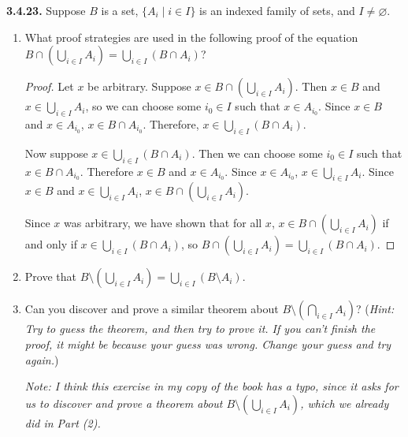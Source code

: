 \documentclass[12pt]{amsart}
\newenvironment{statement}[1]{\smallskip\noindent\color[rgb]{.6627, .3529, .6314} {\bf #1.}}{}
\theoremstyle{definition}
\theoremstyle{remark}
\begin{document}
\begin{statement}{3.4.23}
Suppose $B$ is a set, $\{ A_i \mid i \in I \}$ is an indexed family of sets, and $I \neq \varnothing$.
\begin{enumerate}
	\item What proof strategies are used in the following proof of the equation
	$B \cap \left( \bigcup_{i \in I} A_i \right) = \bigcup_{i \in I} (B \cap A_i)$?
	\begin{proof}
		Let $x$ be arbitrary.
		Suppose $x \in B \cap \left( \bigcup_{i \in I} A_i \right)$.
		Then $x \in B$ and $x \in \bigcup_{i \in I} A_i$,
		so we can choose some $i_0 \in I$ such that $x \in A_{i_0}$.
		Since $x \in B$ and $x \in A_{i_0}$, $x \in B \cap A_{i_0}$.
		Therefore, $x \in \bigcup_{i \in I} (B \cap A_i)$.
		
		Now suppose $x \in \bigcup_{i \in I} (B \cap A_i)$.
		Then we can choose some $i_0 \in I$ such that $x \in B \cap A_{i_0}$.
		Therefore $x \in B$ and $x \in A_{i_0}$.
		Since $x \in A_{i_0}$, $x \in \bigcup_{i \in I} A_i$.
		Since $x \in B$ and $x \in \bigcup_{i \in I} A_i$,
		$x \in B \cap \left( \bigcup_{i \in I} A_i \right)$.
		
		Since $x$ was arbitrary, we have shown that for all $x$,
		$x \in B \cap \left( \bigcup_{i \in I} A_i \right)$ if and only if
		$x \in \bigcup_{i \in I} (B \cap A_i)$, so
		$B \cap \left( \bigcup_{i \in I} A_i \right) = \bigcup_{i \in I} (B \cap A_i)$.
	\end{proof}
	
	\item Prove that $B \setminus \left( \bigcup_{i \in I} A_i \right) = 
	\bigcup_{i \in I} (B \setminus A_i)$.
	
	\item Can you discover and prove a similar theorem about
	$B \setminus \left( \bigcap_{i \in I} A_i \right)$?
	(\emph{Hint: Try to guess the theorem, and then try to prove it.
	If you can't finish the proof, it might be because your guess was wrong.
	Change your guess and try again.})
	
	\emph{Note: I think this exercise in my copy of the book has a typo, since it asks for
	us to discover and prove a theorem about $B \setminus \left( \bigcup_{i \in I} A_i \right)$,
	which we already did in Part (2).}
\end{enumerate}
\end{statement}
\end{document}
